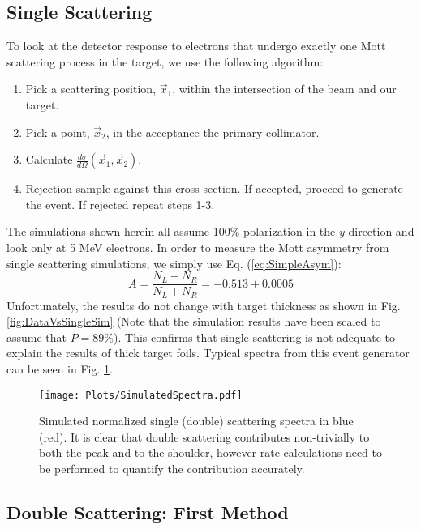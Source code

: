 \documentclass[11pt]{article}
\begin{document}
\subsection{Single Scattering}
To look at the detector response to electrons that undergo exactly one Mott scattering process in the target, we use the following algorithm:
\begin{enumerate}
 \item Pick a scattering position, $\vec{x}_1$, within the intersection of the beam and our target.
 \item Pick a point, $\vec{x}_2$, in the acceptance the primary collimator.
 \item Calculate $\frac{d\sigma}{d\Omega}(\vec{x}_1,\vec{x}_2)$.
 \item Rejection sample against this cross-section. If accepted, proceed to generate the event. If rejected repeat steps 1-3.  
\end{enumerate}
The simulations shown herein all assume 100\% polarization in the $y$ direction and look only at 5 MeV electrons. In order to measure the Mott asymmetry from single scattering simulations, we simply use Eq. (\ref{eq:SimpleAsym}):
\begin{equation}
 A = \frac{N_L-N_R}{N_L+N_R} = -0.513 \pm 0.0005
\end{equation}
Unfortunately, the results do not change with target thickness as shown in Fig. \ref{fig:DataVsSingleSim} (Note that the simulation results have been scaled to assume that $P = 89\%$). This confirms that single scattering is not adequate to explain the results of thick target foils. Typical spectra from this event generator can be seen in Fig. \ref{fig:SimSinglevsDouble}.

\begin{figure}[!h]
 \centering
 \texttt{[image: Plots/SimulatedSpectra.pdf]}
 \caption{Simulated normalized single (double) scattering spectra in blue (red). It is clear that double scattering contributes non-trivially to both the peak and to the shoulder, however rate calculations need to be performed to quantify the contribution accurately.} 
\label{fig:SimSinglevsDouble}
\end{figure}

\subsection{Double Scattering: First Method}
\end{document}

